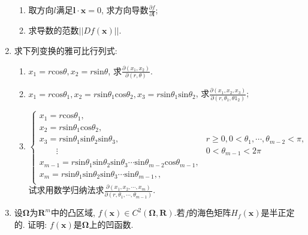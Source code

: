 \begin{enumerate}
\begin{enumerate}
	\item 取方向$l$满足$\bm{l}\cdot \bm{x}=0$, 求方向导数$\frac{\partial f}{\partial \bm{l}}$;
	\item 求导数的范数$||Df(\bm{x})||$.
\end{enumerate}
\item 求下列变换的雅可比行列式:
\begin{enumerate}
		\item $x_1=r\mathrm{cos}\theta, x_2=r\mathrm{sin}\theta$, 求$\frac{\partial (x_1,x_2)}{\partial (r,\theta)}$.
		\item $x_1=r\mathrm{cos}\theta_1, x_2=r\mathrm{sin}\theta_1\mathrm{cos}\theta_2, x_3=r\mathrm{sin}\theta_1\mathrm{sin}\theta_2$, 求$\frac{\partial (x_1,x_2,x_3)}{\partial{(r,\theta_1,\theta1_2)}}$;
		\item $
		\begin{cases}
		x_1 = r\mathrm{cos}\theta_1,&\qquad \\
		x_2 = r\mathrm{sin}\theta_1\mathrm{cos}\theta_2, &\qquad \\ 
		x_3 = r\mathrm{sin}\theta_1\mathrm{sin}\theta_2\mathrm{sin}\theta_3,& r\ge 0, 0<\theta_1,\cdots,\theta_{m-2}<\pi, \\
		\qquad \vdots \qquad&0<\theta_{m-1}<2\pi \\
		x_{m-1} = r\mathrm{sin}\theta_1\mathrm{sin}\theta_2\mathrm{sin}\theta_3\cdots\mathrm{sin}\theta_{m-2}\mathrm{cos}\theta_{m-1},&\qquad \\
		x_m = r\mathrm{sin}\theta_1\mathrm{sin}\theta_2\mathrm{sin}\theta_3\cdots\mathrm{sin}\theta_{m-1},,&\qquad \\
		\end{cases}
		$\\
		试求用数学归纳法求$\frac{\partial(x_1,x_2,\cdots,x_m)}{\partial (r,\theta_1,\cdots,\theta_{m-1})}$.
\end{enumerate}
\item 设$\bm{\Omega}$为$\bm{R}^m$中的凸区域, $f(\bm{x})\in C^2(\bm{\Omega},\bm{R})$.若$f$的海色矩阵$H_f(\bm{x})$是半正定的. 证明: $f(\bm{x})$是$\bm{\Omega}$上的凹函数.
\end{enumerate}


